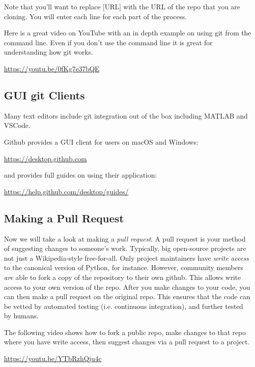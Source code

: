 Note that you'll want to replace [URL] with the URL of the repo that you are cloning. You will enter each line for each part of the process.

Here is a great video on YouTube with an in depth example on using git from the command line. Even if you don't use the command line it is great for understanding how git works.
\begin{center}
	\url{https://youtu.be/0fKg7e37bQE}
\end{center}

\subsection{GUI git Clients}
Many text editors include git integration out of the box including MATLAB and VSCode. 

Github provides a GUI client for users on macOS and Windows:
\begin{center}
\url{https://desktop.github.com}
\end{center}

and provides full guides on using their application:
\begin{center}
	\url{https://help.github.com/desktop/guides/}
\end{center}


\subsection{Making a Pull Request}

Now we will take a look at making a \textit{pull request}. A pull request is your method of suggesting changes to someone's work. Typically, big open-source projects are not just a Wikipedia-style free-for-all. Only project maintainers have \textit{write access} to the canonical version of Python, for instance. However, community members \textit{are} able to fork a copy of the repository to their own github. This allows write access to your own version of the repo. After you make changes to your code, you can then make a pull request on the original repo. This ensures that the code can be vetted by automated testing (i.e. continuous integration), and further tested by humans.

The following video shows how to fork a public repo, make changes to that repo where you have write access, then suggest changes via a pull request to a project.

\begin{center}
	\url{https://youtu.be/YTbRzhQju4c}
\end{center}